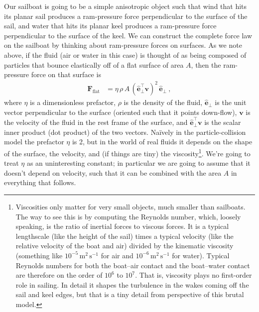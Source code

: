 \documentclass[letterpaper]{article}
\renewcommand{\vec}[1]{\boldsymbol{#1}}
\newcommand{\uvec}{\vec{\hat{e}}}
\renewcommand{\flat}{\text{flat}}
\newcommand{\mmps}{\mathrm{m^2\,s^{-1}}}
\begin{document}
Our sailboat is going to be a simple anisotropic object such that wind that hits its planar sail produces a ram-pressure force perpendicular to the surface of the sail,
and water that hits its planar keel produces a ram-pressure force perpendicular to the surface of the keel.
We can construct the complete force law on the sailboat by thinking about ram-pressure forces on surfaces.
As we note above, if the fluid (air or water in this case) is thought of as being composed of particles that bounce elastically off of a flat surface of area $A$, then the ram-pressure force on that surface is
\begin{align}\label{eq:flat}
    \vec{F}_\flat &= \eta\,\rho\,A\,(\uvec_\perp^\top\vec{v})^2\,\uvec_\perp ~,
\end{align}
where $\eta$ is a dimensionless prefactor, $\rho$ is the density of the fluid, $\uvec_\perp$ is the unit vector perpendicular to the surface (oriented such that it points down-flow), $\vec{v}$ is the velocity of the fluid in the rest frame of the surface, and $\uvec_\perp^\top\vec{v}$ is the scalar inner product (dot product) of the two vectors.
Na\"ively in the particle-collision model the prefactor $\eta$ is 2, but in the world of real fluids it depends on the shape of the surface, the velocity, and (if things are tiny) the viscosity\footnote{%
Viscosities only matter for very small objects, much smaller than sailboats. The way to see this is by computing the Reynolds number, which, loosely speaking, is the ratio of inertial forces to viscous forces. It is a typical lengthscale (like the height of the sail) times a typical velocity (like the relative velocity of the boat and air) divided by the kinematic viscosity (something like $10^{-5}\,\mmps$ for air and $10^{-6}\,\mmps$ for water). Typical Reynolds numbers for both the boat--air contact and the boat--water contact are therefore on the order of $10^6$ to $10^7$. That is, viscosity plays no first-order role in sailing. In detail it shapes the turbulence in the wakes coming off the sail and keel edges, but that is a tiny detail from perspective of this brutal model.}.
We're going to treat $\eta$ as an uninteresting constant; in particular we are going to assume that it doesn't depend on velocity, such that it can be combined with the area $A$ in everything that follows.
\end{document}
